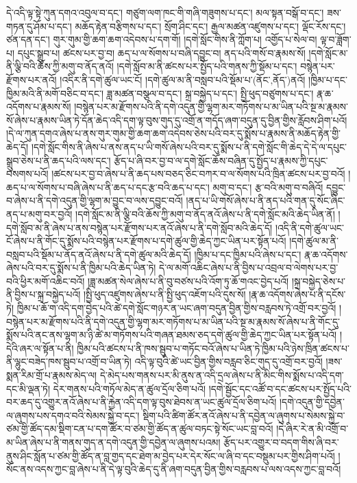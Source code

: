 དེ་འདི་ལྟ་སྟེ་ཀུན་དགའ་འབུལ་བ་དང་། གཙུག་ལག་ཁང་གི་གཞི་གཟུགས་པ་དང་། མལ་སྟན་བསྒོ་བ་དང་། ཟས་གཏན་དུ་ཤོམ་པ་དང་། མཆོད་རྟེན་བརྩིགས་པ་དང་། སྲོག་ཤིང་དང་། རྒྱལ་མཚན་འཛུགས་པ་དང་། ལྡོང་རོས་དང་། ཙན་དན་དང་། གུར་གུམ་གྱི་ཆག་ཆག་འདེབས་པ་དག་གོ། །དགེ་སློང་གིས་ནི་ཀློག་པ། འགྱོད་པ་སེལ་བ། ལྟ་བ་ཟློག་པ། དཔུང་སྒྲུབ་པ། ཚངས་པར་བྱ་བ། ཆད་པ་ལ་སོགས་པ་བཞི་དབྱུང་བ། ནད་པའི་གསོ་བ་རྣམས་སོ། །དགེ་སློང་མ་ནི་ལྕི་བའི་ཆོས་ཀྱི་མགུ་བ་ནོད་ནའོ། །དགེ་སློབ་མ་ནི་ཚངས་པར་སྤྱོད་པའི་གནས་ཀྱི་སྡོམ་པ་དང་། བསྙེན་པར་རྫོགས་པར་ནའོ། །འདིར་ནི་དགེ་ཚུལ་ཡང་ངོ། །དགེ་ཚུལ་མ་ནི་བསླབ་པའི་སྡོམ་པ་(ནོང་‚ནོད་)ནའོ། །ཁྱིམ་པ་དང་ཁྱིམ་མའི་ནི་མགོ་བཅིང་བ་དང་། ཟླ་མཚན་བསྩལ་བ་དང་། སྐྲ་བསྐྱེད་པ་དང་། སྤྱི་ཕུད་བཙུགས་པ་དང་། རྣ་ཆ་འདོགས་པ་རྣམས་སོ། །བསྙེན་པར་མ་རྫོགས་པའི་ནི་དགེ་འདུན་གྱི་ལྷག་མར་གཏོགས་པ་མ་ཡིན་པའི་སྔ་མ་རྣམས་སོ་ཞེས་པ་རྣམས་ཡིན་ཏེ་དོན་ཆེད་འདི་དག་ལྟ་བུས་གུད་དུ་འགྲོ་ན་གདོད་ཞག་བདུན་དུ་བྱིན་གྱིས་རློབས་ཤིག་པའོ། །དེ་ལ་ཀུན་དགའ་ཞེས་པ་ནས་གུར་གུམ་གྱི་ཆག་ཆག་འདེབས་ཅེས་པའི་བར་དུ་སྨོས་པ་རྣམས་ནི་མཆོད་རྟེན་གྱི་ཆེད་དོ། །དགེ་སློང་གིས་ནི་ཞེས་པ་ནས་ནད་པ་ཡི་གསོ་ཞེས་པའི་བར་དུ་སྨོས་པ་ནི་དགེ་སློང་གི་ཆེད་དེ་དེ་ལ་དཔུང་སྒྲུབ་ཅེས་པ་ནི་ཆད་པའི་ལས་དང་། རྩོད་པ་ཞི་བར་བྱ་བ་ལ་དགེ་སློང་ཆོས་བཞིན་དུ་སྤྱོད་པ་རྣམས་ཀྱི་དཔུང་བསགས་པའོ། །ཚངས་པར་བྱ་བ་ཞེས་པ་ནི་ཆད་པས་བཅད་ཅིང་བཀར་བ་ལ་སོགས་པའི་ཁྲིན་ཚངས་པར་བྱ་བའོ། །ཆད་པ་ལ་སོགས་པ་བཞི་ཞེས་པ་ནི་ཆད་པ་དང་རྩ་བའི་ཆད་པ་དང་། མགུ་བ་དང་། རྩ་བའི་མགུ་བ་བཞིའོ། དབྱུང་བ་ཞེས་པ་ནི་དགེ་འདུན་གྱི་ལྷག་མ་བྱུང་བ་ལས་དབྱུང་བའོ། །ནད་པ་ཡི་གསོ་ཞེས་པ་ནི་ནད་པའི་གན་དུ་སོང་ཞིང་ནད་པ་མགུ་བར་བྱའོ། །དགེ་སློང་མ་ནི་ལྕི་བའི་ཆོས་ཀྱི་མགུ་བ་ནོད་ནའོ་ཞེས་པ་ནི་དགེ་སློང་མའི་ཆེད་ཡིན་ནོ། །དགེ་སློབ་མ་ནི་ཞེས་པ་ནས་བསྙེན་པར་རྫོགས་པར་ནའོ་ཞེས་པ་ནི་དགེ་སློབ་མའི་ཆེད་དོ། །འདི་ནི་དགེ་ཚུལ་ཡང་ངོ་ཞེས་པ་ནི་གོང་དུ་སྨོས་པའི་བསྙེན་པར་རྫོགས་པ་དགེ་ཚུལ་གྱི་ཆེད་ཀྱང་ཡིན་པར་སྟོན་པའོ། །དགེ་ཚུལ་མ་ནི་བསླབ་པའི་སྡོམ་པ་ནོད་ནའོ་ཞེས་པ་ནི་དགེ་ཚུལ་མའི་ཆེད་དོ། །ཁྱིམ་པ་དང་ཁྱིམ་པའི་ཞེས་པ་དང་། རྣ་ཆ་འདོགས་ཞེས་པའི་བར་དུ་སྨོས་པ་ནི་ཁྱིམ་པའི་ཆེད་ཡིན་ཏེ། དེ་ལ་མགོ་འཆིང་ཞེས་པ་ནི་བྱིས་པ་འབྲལ་བ་ལེགས་པར་བྱ་བའི་ཕྱིར་མགོ་འཆིང་བའོ། །ཟླ་མཚན་སེལ་ཞེས་པ་ནི་བུ་བཙས་པའི་འོག་ཏུ་ཆོ་གའང་བྱེད་པའོ། །སྐྲ་བསྐྱེད་ཅེས་པ་ནི་བྱིས་པ་སྐྲ་བསྐྱེད་པའོ། །སྤྱི་ཕུད་འཛུགས་ཞེས་པ་ནི་སྤྱི་ཕུད་འཇོག་པའི་དུས་སོ། །རྣ་ཆ་འདོགས་ཞེས་པ་ནི་དངོས་ཏེ། ཁྱིམ་པ་ཆོ་ག་འདི་དག་བྱེད་པའི་ཚེ་དགེ་སློང་གཉར་ན་ཡང་ཞག་བདུན་བྱིན་གྱིས་བརླབས་ཏེ་འགྲོ་བར་བྱའོ། །བསྙེན་པར་མ་རྫོགས་པའི་ནི་དགེ་འདུན་གྱི་ལྷག་མར་གཏོགས་པ་མ་ཡིན་པའི་སྔ་མ་རྣམས་སོ་ཞེས་པ་ནི་གོང་དུ་སྨོས་པའི་ནང་ནས་ལྷག་མ་ཉི་ཚེ་མ་གཏོགས་པའི་གཞན་ཐམས་ཅད་དགེ་ཚུལ་གྱི་ཆེད་ཀྱང་ཡིན་པར་སྟོན་པའོ། །དེའི་ཞར་ལ་སྟོན་པ་ནི། ཁྱིམ་པའི་ཚངས་པ་ནི་ཁས་སྦུབ་པ་གཏོང་བའོ་ཞེས་པ་ཡིན་ཏེ་ཁྱིམ་པའི་ཉེས་ཁྲིན་ཚངས་པ་ནི་ལྷུང་བཟེད་ཁས་སྦུབ་པ་འགྲོ་བ་ཡིན་ཏེ། འདི་ལྟ་བུའི་ཚེ་ཡང་བྱིན་གྱིས་བརླབ་ཅིང་གུད་དུ་འགྲོ་བར་བྱའོ། །ཟས་སྨན་རིམ་གྲོ་པ་རྣམས་མེད་ལ། དེ་མེད་པས་གནས་པར་མི་ནུས་ན་འདི་དྲལ་ཞེས་པ་ནི་མིང་གིས་སྨོས་པ་འདི་དག་དང་མི་ལྡན་ཏེ། དེར་གནས་པའི་གཏོལ་མེད་ན་ཚུལ་དྲོལ་ཅིག་པའོ། །དགེ་སྦྱོང་དང་འཚོ་བ་དང་ཚངས་པར་སྤྱོད་པའི་བར་ཆད་དུ་འགྱུར་ནའོ་ཞེས་པ་ནི་རྐྱེན་འདི་དག་ལྟ་བུས་ཐེབས་ན་ཡང་ཚུལ་དྲོལ་ཅིག་པའོ། །དགེ་འདུན་གྱི་དབྱེན་ལ་ཞུགས་པས་དགའ་བའི་སེམས་སྐྱེ་བ་དང་། སྡིག་པའི་ཚིག་ཚོར་ནའོ་ཞེས་པ་ནི་དབྱེན་ལ་ཞུགས་པ་སེམས་སྐྱེ་བ་ཙམ་གྱི་ཚོད་དམ་སྡིག་ངན་པ་དག་ཚོར་བ་ཙམ་གྱི་ཚོད་ན་ཚུལ་བཏང་སྟེ་སོང་ཡང་བླ་བའོ། །དེ་ཞིར་རེ་ན་མི་འགྲོ་བ་མ་ཡིན་ཞེས་པ་ནི་གནས་གུད་ན་དགེ་འདུན་གྱི་དབྱེན་ལ་ཞུགས་པའམ། རྩོད་པར་འགྱུར་བ་བདག་གིས་ཞི་བར་ནུས་ཤིང་སློན་པ་ཙམ་གྱི་ཚོད་ན་བླ་གྱད་དང་ཐེག་མ་བྱེད་པར་དེར་སོང་ལ་ཞི་བ་དང་བསྡུམ་པར་གྱིས་ཤིག་པའོ། །སོང་ནས་འདས་ཀྱང་བླ་ཞེས་པ་ནི་དེ་ལྟ་བུའི་ཆེད་དུ་ནི་ཞག་བདུན་བྱིན་གྱིས་བརླབས་པ་ལས་འདས་ཀྱང་བླ་བའོ། 